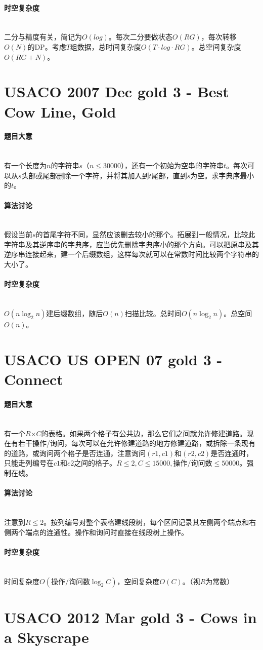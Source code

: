 \documentclass[UTF8]{ctexart}
\newcommand{\myparagraph}[1]{\paragraph{#1}\mbox{}\\}
\theoremstyle{nonumberplain}
\begin{document}
		\myparagraph{时空复杂度}
		
			二分与精度有关，简记为$O(log)$。每次二分要做状态$O(RG)$，每次转移$O(N)$的DP。考虑$T$组数据，总时间复杂度$O(T \cdot log \cdot RG)$。总空间复杂度$O(RG+N)$。
	
	\section{USACO 2007 Dec gold 3 - Best Cow Line, Gold}
	
		\myparagraph{题目大意}
		
			有一个长度为$n$的字符串$s$（$n \leq 30000$），还有一个初始为空串的字符串$t$。每次可以从$s$头部或尾部删除一个字符，并将其加入到$t$尾部，直到$s$为空。求字典序最小的$t$。
		
		\myparagraph{算法讨论}
		
			假设当前$s$的首尾字符不同，显然应该删去较小的那个。拓展到一般情况，比较此字符串及其逆序串的字典序，应当优先删除字典序小的那个方向。可以把原串及其逆序串连接起来，建一个后缀数组，这样每次就可以在常数时间比较两个字符串的大小了。
		
		\myparagraph{时空复杂度}
		
			$O(n\log_2n)$建后缀数组，随后$O(n)$扫描比较。总时间$O(n\log_2n)$。总空间$O(n)$。
	
	\section{USACO US OPEN 07 gold 3 - Connect}
	
		\myparagraph{题目大意}
		
			有一个$R$×$C$的表格。如果两个格子有公共边，那么它们之间就允许修建道路。现在有若干操作/询问，每次可以在允许修建道路的地方修建道路，或拆除一条现有的道路，或询问两个格子是否连通，注意询问$(r1,c1)$和$(r2,c2)$是否连通时，只能走列编号在$c1$和$c2$之间的格子。$R \leq 2, C \leq 15000, \mbox{操作/询问数} \leq 50000$。强制在线。
		
		\myparagraph{算法讨论}
		
			注意到$R \leq 2$。按列编号对整个表格建线段树，每个区间记录其左侧两个端点和右侧两个端点的连通性。操作和询问时直接在线段树上操作。
		
		\myparagraph{时空复杂度}
		
			时间复杂度$O(\mbox{操作/询问数}\log_2C)$，空间复杂度$O(C)$。（视$R$为常数）
	
	\section{USACO 2012 Mar gold 3 - Cows in a Skyscrape}
	
\end{document}
